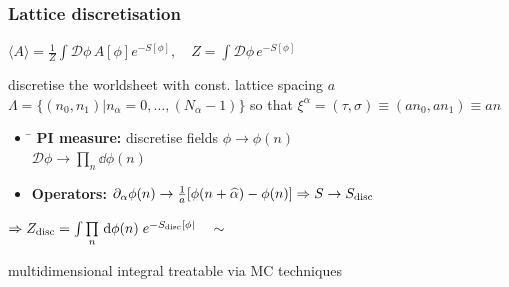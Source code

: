 \documentclass{beamer}
\newcommand{\del}{\partial}
\begin{document}
\begin{frame}
\frametitle{Lattice discretisation}
\begin{minipage}{0.65\linewidth}
\begin{tcolorbox}[colback=white!95!black, colframe=white!90!black]
{\small ${\!\!\!\!\!\!\!\langle A \rangle = \tfrac{1}{Z}\int \mathcal{D}\phi\, A[\phi]e^{-S[\phi]}, \quad Z=\int \mathcal{D}\phi\,e^{-S[\phi]}}$}
\end{tcolorbox}%
discretise the worldsheet with const. lattice spacing $a$ \\
{\small$\mathit{\Lambda}=\lbrace(n_{0},n_{1})\vert n_{\alpha}=0,\ldots,(N_{\alpha}-1)\rbrace$} so that {\small$\xi^{\alpha}=(\tau,\sigma)\equiv (an_{0},an_{1}) \equiv an$}
\end{minipage}
\begin{minipage}{0.3\linewidth}
\end{minipage}

%
\begin{itemize}
\item 
\begin{tabbing}
\hspace{3cm}\=\kill
 \textbf{PI measure:} \> discretise fields $\phi \to \phi(n)$ \\ 
   \> $\mathcal{D}\phi \to \prod\limits_{n} \dd \phi(n)$
\end{tabbing} 
\item \textbf{Operators: } $\del_{\alpha}\phi(n) \to \tfrac{1}{a}[\phi(n+\hat{\alpha})-\phi(n)] \Rightarrow S \to S_{\rm disc}$
\end{itemize}\hfill
\begin{minipage}{0.6\linewidth}
$\Rightarrow Z_{\rm disc} = \int \prod\limits_{n} \, \mathrm{d}\phi(n)\; e^{-S_{\rm disc}[\phi|}\quad\sim$
\end{minipage} 
\begin{minipage}{0.38\linewidth}
multidimensional integral treatable via MC techniques
\end{minipage}
\end{frame}
\end{document}
